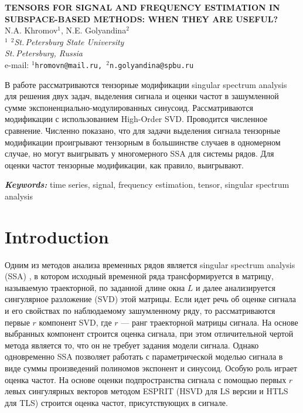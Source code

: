 \documentclass[12pt]{article}
\providecommand{\keywords}[1]
{
  \vspace{2mm}\hspace{20pt}\textbf{\textit{Keywords:}} #1
}
\providecommand{\abskeyw}[2]
{
  \begin{small}
    \begin{adjustwidth}{10mm}{10mm}
      \vspace{1mm}\hspace{20pt}#1

      \keywords{#2}
    \end{adjustwidth}
  \end{small}
}
\theoremstyle{definition}
\theoremstyle{remark}
\begin{document}
\begin{center}
  {\Large\bf TENSORS FOR SIGNAL AND FREQUENCY ESTIMATION IN
  SUBSPACE-BASED METHODS: WHEN THEY ARE USEFUL?}\\\vspace{2mm} {\sc N.A.
  Khromov$^1$, N.E. Golyandina$^2$}\\\vspace{2mm}
{\it $^{1}$ $^{2}$St.\,Petersburg State University\\
St.\,Petersburg, Russia\\} e-mail: {\tt $^1$hromovn@mail.ru,
$^2$n.golyandina@spbu.ru}

  \abskeyw{В работе рассматриваются тензорные модификации singular spectrum analysis для решения двух задач, выделения сигнала и оценки частот в зашумленной сумме экспоненциально-модулированных синусоид.  Рассматриваются модификации с использованием High-Order SVD. Проводится численное сравнение. Численно показано, что для задачи выделения сигнала тензорные модификации проигрывают тензорным в большинстве случаев в одномерном случае, но могут выигрывать у многомерного SSA для системы рядов. Для оценки частот тензорные модификации, как правило, выигрывают.}{time series, signal, frequency estimation, tensor, singular spectrum analysis}
\end{center}

\section{Introduction}

Одним из методов анализа временных рядов является singular spectrum analysis (SSA) \cite{...}, в котором исходный временной ряда трансформируется в матрицу, называемую траекторной, по заданной длине окна $L$ и далее анализируется сингулярное разложение (SVD) этой матрицы. Если идет речь об оценке сигнала и его свойствах по наблюдаемому зашумленному ряду, то рассматриваются первые $r$ компонент SVD, где $r$ --- ранг траекторной матрицы сигнала. На основе выбранных компонент строится оценка сигнала, при этом отличительной чертой метода является то, что он не требует задания модели сигнала. Однако одновременно SSA позволяет работать с параметрической моделью сигнала в виде суммы произведений полиномов экспонент и синусоид. Особую роль играет оценка частот. На основе оценки подпространства сигнала с  помощью первых $r$ левых сингулярных векторов методом ESPRIT (HSVD для LS версии и HTLS для TLS) \cite{...} строится оценка частот, присутствующих в сигнале. 
\end{document}
